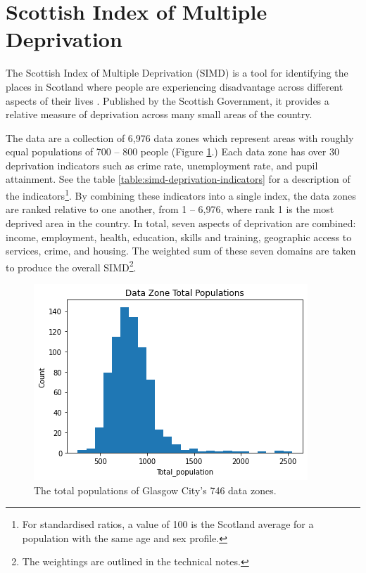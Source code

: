 \documentclass{thesis}
\begin{document}
\section{Scottish Index of Multiple Deprivation}

The Scottish Index of Multiple Deprivation (SIMD) is a tool for identifying the places in Scotland where people are experiencing disadvantage across different aspects of their lives \cite{simd}. Published by the Scottish Government, it provides a relative measure of deprivation across many small areas of the country.

The data are a collection of 6,976 data zones which represent areas with roughly equal populations of 700 -- 800 people (Figure \ref{fig:dz-total-populations}.) Each data zone has over 30 deprivation indicators such as crime rate, unemployment rate, and pupil attainment. See the table \ref{table:simd-deprivation-indicators} for a description of the indicators\footnote{For standardised ratios, a value of 100 is the Scotland average for a population with the same age and sex profile.}. By combining these indicators into a single index, the data zones are ranked relative to one another, from 1 -- 6,976, where rank 1 is the most deprived area in the country. In total, seven aspects of deprivation are combined: income, employment, health, education, skills and training, geographic access to services, crime, and housing. The weighted sum of these seven domains are taken to produce the overall SIMD\footnote{The weightings are outlined in the technical notes\cite{simd-technical-notes}.}.

\begin{figure}[h]
    \centering
    \includegraphics[scale=0.6]{images/dz-total-population.png}
    \caption{The total populations of Glasgow City's 746 data zones.}
    \label{fig:dz-total-populations}
\end{figure}
\end{document}
